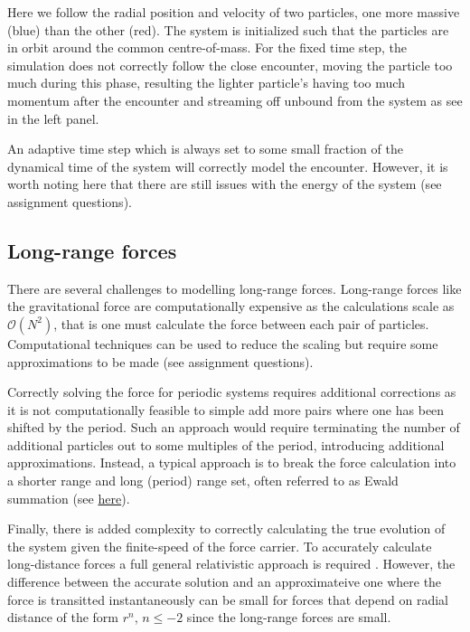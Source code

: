 \par 
Here we follow the radial position and velocity of two particles, one more massive (blue) than the other (red). The system is initialized such that the particles are in orbit around the common centre-of-mass. For the fixed time step, the simulation does not correctly follow the close encounter, moving the particle too much during this phase, resulting the lighter particle's having too much momentum after the encounter and streaming off unbound from the system as see in the left panel. 

\par 
An adaptive time step which is always set to some small fraction of the dynamical time of the system will correctly model the encounter. However, it is worth noting here that there are still issues with the energy of the system (see assignment questions). 

\subsection{Long-range forces}
\label{sec:nbody:longrange}
There are several challenges to modelling long-range forces. Long-range forces like the gravitational force are computationally expensive as the calculations scale as $\mathcal{O}(N^2)$, that is one must calculate the force between each pair of particles. Computational techniques can be used to reduce the scaling but require some approximations to be made (see assignment questions).

\par 
Correctly solving the force for periodic systems requires additional corrections as it is not computationally feasible to simple add more pairs where one has been shifted by the period. Such an approach would require terminating the number of additional particles out to some multiples of the period, introducing additional approximations. Instead, a typical approach is to break the force calculation into a shorter range and long (period) range set, often referred to as Ewald summation (see \href{https://en.wikipedia.org/wiki/Ewald_summation}{here}). 

\par 
Finally, there is added complexity to correctly calculating the true evolution of the system given the finite-speed of the force carrier. To accurately calculate long-distance forces a full general relativistic approach is required \cite{grnbody}. However, the difference between the accurate solution and an approximateive one where the force is transitted instantaneously can be small for forces that depend on radial distance of the form $r^{n}$, $n\leq-2$ since the long-range forces are small\cite{grcorrections}.


